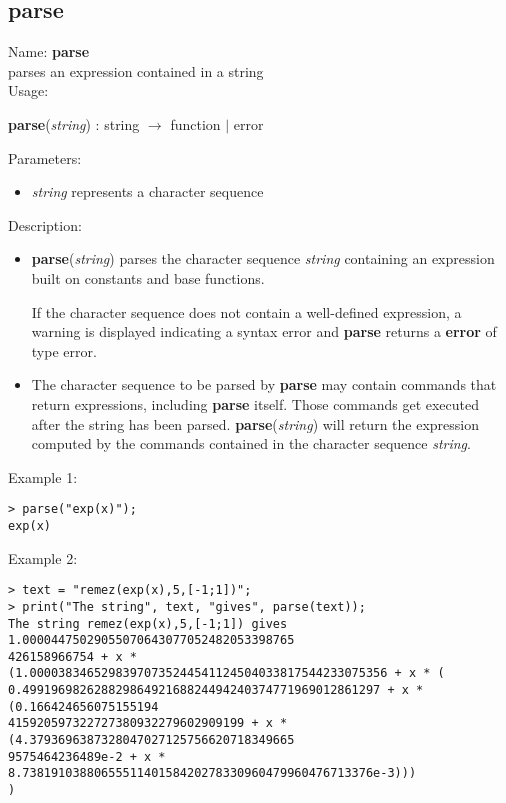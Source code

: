\subsection{parse}
\label{labparse}
\noindent Name: \textbf{parse}\\
parses an expression contained in a string\\
\noindent Usage: 
\begin{center}
\textbf{parse}(\emph{string}) : \textsf{string} $\rightarrow$ \textsf{function} $|$ \textsf{error}
\\ 
\end{center}
Parameters: 
\begin{itemize}
\item \emph{string} represents a character sequence
\end{itemize}
\noindent Description: \begin{itemize}

\item \textbf{parse}(\emph{string}) parses the character sequence \emph{string} containing
   an expression built on constants and base functions.
    
   If the character sequence does not contain a well-defined expression,
   a warning is displayed indicating a syntax error and \textbf{parse} returns
   a \textbf{error} of type \textsf{error}.

\item The character sequence to be parsed by \textbf{parse} may contain commands that 
   return expressions, including \textbf{parse} itself. Those commands get executed after the string has been parsed.
   \textbf{parse}(\emph{string}) will return the expression computed by the commands contained in the character 
   sequence \emph{string}.
\end{itemize}
\noindent Example 1: 
\begin{center}\begin{minipage}{15cm}\begin{Verbatim}[frame=single]
> parse("exp(x)");
exp(x)
\end{Verbatim}
\end{minipage}\end{center}
\noindent Example 2: 
\begin{center}\begin{minipage}{15cm}\begin{Verbatim}[frame=single]
> text = "remez(exp(x),5,[-1;1])";
> print("The string", text, "gives", parse(text));
The string remez(exp(x),5,[-1;1]) gives 1.00004475029055070643077052482053398765
426158966754 + x * (1.00003834652983970735244541124504033817544233075356 + x * (
0.49919698262882986492168824494240374771969012861297 + x * (0.166424656075155194
415920597322727380932279602909199 + x * (4.3793696387328047027125756620718349665
9575464236489e-2 + x * 8.7381910388065551140158420278330960479960476713376e-3)))
)
\end{Verbatim}
\end{minipage}\end{center}
